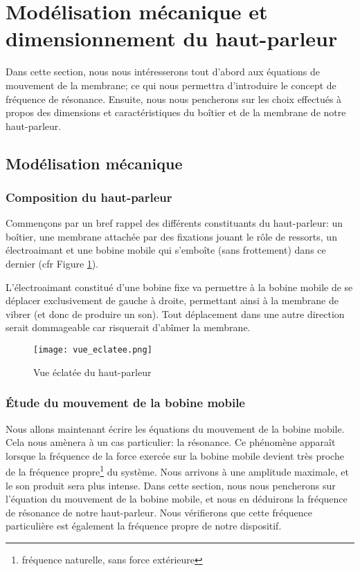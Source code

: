 




\section{Modélisation mécanique et dimensionnement du haut-parleur}

Dans cette section, nous nous intéresserons tout d'abord aux équations de mouvement de la membrane; ce qui nous permettra d'introduire le concept de fréquence de résonance. Ensuite, nous nous pencherons sur les choix effectués à propos des dimensions et caractéristiques du boîtier et de la membrane de notre haut-parleur.

\subsection{Modélisation mécanique}


\subsubsection{Composition du haut-parleur}
Commençons par un bref rappel des différents constituants du haut-parleur:
un boîtier, une membrane attachée par des fixations jouant le rôle de ressorts, 
un électroaimant et une bobine mobile qui s'emboîte (sans frottement)
dans ce dernier (cfr Figure \ref{vueeclatee}).

L'électroaimant constitué d'une bobine fixe va permettre à la bobine mobile de se déplacer exclusivement de gauche
à droite, permettant ainsi à la membrane de vibrer (et donc de produire un son). Tout déplacement dans une autre direction serait dommageable car risquerait d'abîmer la membrane.

\begin{figure}[ht!]
\centering
\texttt{[image: vue\_eclatee.png]}
\caption{Vue éclatée du haut-parleur}
\label{vueeclatee}
\end{figure}

\subsubsection{Étude du mouvement de la bobine mobile}
Nous allons maintenant écrire les équations du mouvement de la bobine mobile. Cela nous amènera à un cas particulier: la résonance. Ce phénomène apparaît lorsque la fréquence de la force exercée sur la bobine mobile devient très proche de la fréquence propre\footnote{fréquence naturelle, sans force extérieure} du système\cite{resonance}. Nous arrivons à une amplitude maximale, et le son produit sera plus intense. Dans cette section, nous nous pencherons sur l'équation du mouvement de la bobine mobile, et nous en déduirons la fréquence de résonance de notre haut-parleur. Nous vérifierons que cette fréquence particulière est également la fréquence propre de notre dispositif.


